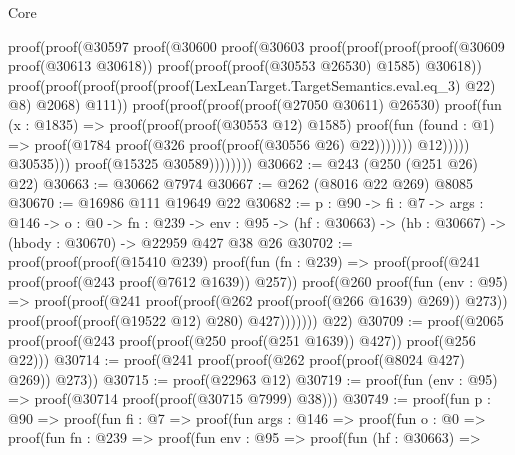 \begin{lexlean}{Core}
\begin{coremodule}
                          proof(proof(@30597
                                proof(@30600
                                    proof(@30603
                                        proof(proof(proof(proof(@30609 proof(@30613 @30618))
                                                proof(proof(proof(@30553 @26530) @1585) @30618))
                                              proof(proof(proof(proof(proof(LexLeanTarget.TargetSemantics.eval.eq_3)
                                                        @22)
                                                      @8)
                                                    @2068)
                                                  @111))
                                            proof(proof(proof(proof(@27050 @30611) @26530)
                                                  proof(fun (x : @1835) =>
                                                    proof(proof(proof(@30553 @12) @1585)
                                                        proof(fun (found : @1) =>
                                                          proof(@1784
                                                              proof(@326
                                                                  proof(proof(@30556 @26) @22)))))))
                                                @12)))))
                              @30535)))
                    proof(@15325 @30589))))))))
@30662 := @243 (@250 (@251 @26) @22)
@30663 := @30662 @7974
@30667 := @262 (@8016 @22 @269) @8085
@30670 := @16986 @111 @19649 @22
@30682 := {p : @90} ->
  {fi : @7} ->
  {args : @146} ->
  {o : @0} ->
  {fn : @239} ->
  {env : @95} -> (hf : @30663) -> (hb : @30667) -> (hbody : @30670) -> @22959 @427 @38 @26
@30702 := proof(proof(proof(@15410 @239)
        proof(fun (fn : @239) =>
          proof(proof(@241 proof(proof(@243 proof(@7612 @1639)) @257))
              proof(@260
                  proof(fun (env : @95) =>
                    proof(proof(@241 proof(proof(@262 proof(proof(@266 @1639) @269)) @273))
                        proof(proof(proof(@19522 @12) @280) @427)))))))
      @22)
@30709 := proof(@2065 proof(proof(@243 proof(proof(@250 proof(@251 @1639)) @427)) proof(@256 @22)))
@30714 := proof(@241 proof(proof(@262 proof(proof(@8024 @427) @269)) @273))
@30715 := proof(@22963 @12)
@30719 := proof(fun (env : @95) => proof(@30714 proof(proof(@30715 @7999) @38)))
@30749 := proof(fun {p : @90} =>
    proof(fun {fi : @7} =>
      proof(fun {args : @146} =>
        proof(fun {o : @0} =>
          proof(fun {fn : @239} =>
            proof(fun {env : @95} =>
              proof(fun (hf : @30663) =>

\end{coremodule}
\end{lexlean}
